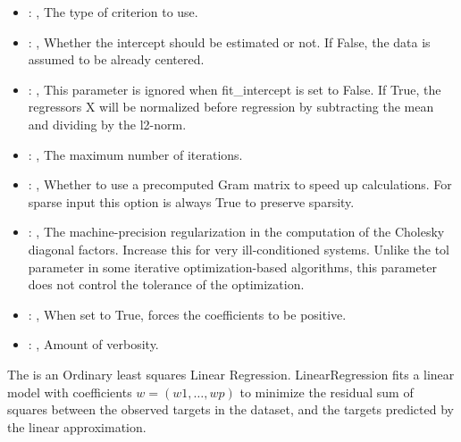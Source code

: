 \begin{itemize}
    \item {}: , 
      The type of criterion to use.

    \item {}: , 
      Whether the intercept should be estimated or not. If False,
      the data is assumed to be already centered.

    \item {}: , 
      This parameter is ignored when fit\_intercept is set to False. If True,
      the regressors X will be normalized before regression by subtracting the mean and
      dividing by the l2-norm.

    \item {}: , 
      The maximum number of iterations.

    \item {}: , 
      Whether to use a precomputed Gram matrix to speed up calculations.
      For sparse input this option is always True to preserve sparsity.

    \item {}: , 
      The machine-precision regularization in the computation of the Cholesky
      diagonal factors. Increase this for very ill-conditioned systems. Unlike the tol
      parameter in some iterative optimization-based algorithms, this parameter does not
      control the tolerance of the optimization.

    \item {}: , 
      When set to True, forces the coefficients to be positive.

    \item {}: , 
      Amount of verbosity.
  \end{itemize}
 The                          is an Ordinary least squares Linear
 Regression.                         LinearRegression fits a linear model with coefficients $w =
 (w1, …, wp)$ to                         minimize the residual sum of squares between the observed
 targets in the                         dataset, and the targets predicted by the linear
 approximation.                         

